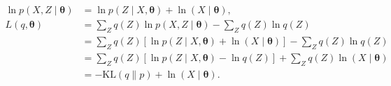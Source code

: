 \documentclass[12pt]{article}
\newcommand{\vect}[1]{\boldsymbol{#1}}
\begin{document}
\begin{align}
\ln p(X,Z\mid \vect{\theta}) & = \ln p(Z\mid X, \vect{\theta}) + \ln(X\mid \vect{\theta}),\\
L(q,\vect{\theta}) & = \sum_Z q(Z) \ln p(X,Z\mid \vect{\theta}) - \sum_Z q(Z) \ln q(Z) \\
                   & = \sum_Z q(Z) [   \ln p(Z\mid X, \vect{\theta}) + \ln(X\mid \vect{\theta})  ] - \sum_Z q(Z) \ln q(Z)\\
                   & = \sum_Z q(Z) [\ln p(Z\mid X, \vect{\theta}) - \ln q(Z)] + \sum_Z q(Z) \ln(X\mid \vect{\theta}) \\
                   & = -\mathrm{KL}(q \| p) + \ln(X\mid \vect{\theta}).
\end{align}

\end{document}
